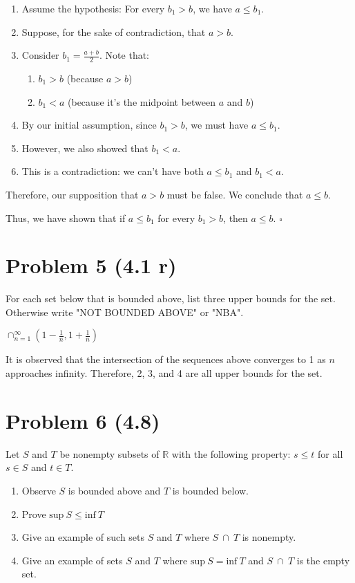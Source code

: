 \documentclass{article}
\begin{document}
\begin{enumerate}
    \item Assume the hypothesis: For every $b_1 > b$, we have $a \leq b_1$.
    \item Suppose, for the sake of contradiction, that $a > b$.
    \item Consider $b_1 = \frac{a + b}{2}$. Note that:
    \begin{enumerate}
        \item $b_1 > b$ (because $a > b$)
        \item $b_1 < a$ (because it's the midpoint between $a$ and $b$)
    \end{enumerate}
    \item By our initial assumption, since $b_1 > b$, we must have $a \leq b_1$.
    \item However, we also showed that $b_1 < a$.
    \item This is a contradiction: we can't have both $a \leq b_1$ and $b_1 < a$.
\end{enumerate}

Therefore, our supposition that $a > b$ must be false. We conclude that $a \leq b$.

Thus, we have shown that if $a \leq b_1$ for every $b_1 > b$, then $a \leq b$. $\square$

\section*{Problem 5 (4.1 r)}
For each set below that is bounded above, list three upper bounds for the set. Otherwise write "NOT BOUNDED ABOVE" or "NBA".

$\cap_{n=1}^\infty\left( 1-\frac{1}{n}, 1+\frac{1}{n} \right)$

It is observed that the intersection of the sequences above converges to 1 as $n$ approaches infinity. Therefore, 2, 3, and 4 are all upper bounds for the set.

\section*{Problem 6 (4.8)}
Let $S$ and $T$ be nonempty subsets of $\mathbb{R}$ with the following property:
$s\leq t$ for all $s \in S$ and $t \in T$.

\begin{enumerate}
    \item Observe $S$ is bounded above and $T$ is bounded below.
    \item Prove $\text{sup}\ S \leq \text{inf}\ T$
    \item Give an example of such sets $S$ and $T$ where $S \ \cap \ T$ is nonempty.
    \item Give an example of sets $S$ and $T$ where $\text{sup}\ S = \text{inf}\ T$ and $S \ \cap \ T$ is the empty set.
\end{enumerate}
\end{document}
